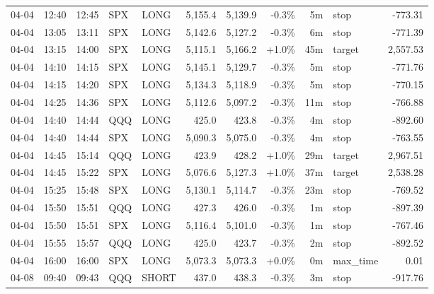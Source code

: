 \documentclass[11pt,a4paper,twoside]{article}
\begin{document}
\begin{center}
\begin{longtable}{>{\color{txtmain}}l l l l l r r r r >{\color{txtmain}}l r}
04-04 & 12:40 & 12:45 & SPX & LONG & 5,155.4 & 5,139.9 & \textcolor{lossred}{-0.3\%} & 5m & stop & \textcolor{lossred}{-773.31} \\
04-04 & 13:05 & 13:11 & SPX & LONG & 5,142.6 & 5,127.2 & \textcolor{lossred}{-0.3\%} & 6m & stop & \textcolor{lossred}{-771.39} \\
04-04 & 13:15 & 14:00 & SPX & LONG & 5,115.1 & 5,166.2 & \textcolor{wingreen}{+1.0\%} & 45m & target & \textcolor{wingreen}{2,557.53} \\
04-04 & 14:10 & 14:15 & SPX & LONG & 5,145.1 & 5,129.7 & \textcolor{lossred}{-0.3\%} & 5m & stop & \textcolor{lossred}{-771.76} \\
04-04 & 14:15 & 14:20 & SPX & LONG & 5,134.3 & 5,118.9 & \textcolor{lossred}{-0.3\%} & 5m & stop & \textcolor{lossred}{-770.15} \\
04-04 & 14:25 & 14:36 & SPX & LONG & 5,112.6 & 5,097.2 & \textcolor{lossred}{-0.3\%} & 11m & stop & \textcolor{lossred}{-766.88} \\
04-04 & 14:40 & 14:44 & QQQ & LONG & 425.0 & 423.8 & \textcolor{lossred}{-0.3\%} & 4m & stop & \textcolor{lossred}{-892.60} \\
04-04 & 14:40 & 14:44 & SPX & LONG & 5,090.3 & 5,075.0 & \textcolor{lossred}{-0.3\%} & 4m & stop & \textcolor{lossred}{-763.55} \\
04-04 & 14:45 & 15:14 & QQQ & LONG & 423.9 & 428.2 & \textcolor{wingreen}{+1.0\%} & 29m & target & \textcolor{wingreen}{2,967.51} \\
04-04 & 14:45 & 15:22 & SPX & LONG & 5,076.6 & 5,127.3 & \textcolor{wingreen}{+1.0\%} & 37m & target & \textcolor{wingreen}{2,538.28} \\
04-04 & 15:25 & 15:48 & SPX & LONG & 5,130.1 & 5,114.7 & \textcolor{lossred}{-0.3\%} & 23m & stop & \textcolor{lossred}{-769.52} \\
04-04 & 15:50 & 15:51 & QQQ & LONG & 427.3 & 426.0 & \textcolor{lossred}{-0.3\%} & 1m & stop & \textcolor{lossred}{-897.39} \\
04-04 & 15:50 & 15:51 & SPX & LONG & 5,116.4 & 5,101.0 & \textcolor{lossred}{-0.3\%} & 1m & stop & \textcolor{lossred}{-767.46} \\
04-04 & 15:55 & 15:57 & QQQ & LONG & 425.0 & 423.7 & \textcolor{lossred}{-0.3\%} & 2m & stop & \textcolor{lossred}{-892.52} \\
04-04 & 16:00 & 16:00 & SPX & LONG & 5,073.3 & 5,073.3 & \textcolor{wingreen}{+0.0\%} & 0m & max\_time & \textcolor{wingreen}{0.01} \\
04-08 & 09:40 & 09:43 & QQQ & SHORT & 437.0 & 438.3 & \textcolor{lossred}{-0.3\%} & 3m & stop & \textcolor{lossred}{-917.76} \\

\end{longtable}
\end{center}
\end{document}
